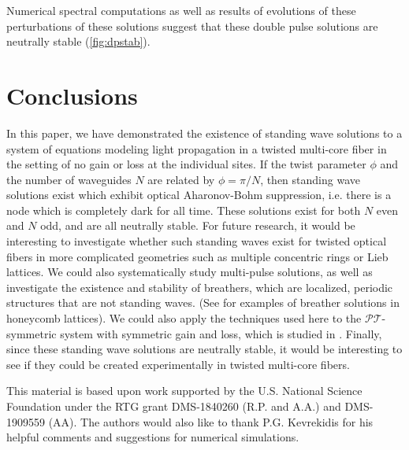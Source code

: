 \documentclass[reprint, amsmath,amssymb,aps,pra]{revtex4-2}
\begin{document}
Numerical spectral computations as well as results of evolutions of these perturbations of these solutions suggest that these double pulse solutions are neutrally stable (\cref{fig:dpstab}).

\section{Conclusions}

In this paper, we have demonstrated the existence of standing wave solutions to a system of equations modeling light propagation in a twisted multi-core fiber in the setting of no gain or loss at the individual sites. If the twist parameter $\phi$ and the number of waveguides $N$ are related by $\phi = \pi/N$, then standing wave solutions exist which exhibit optical Aharonov-Bohm suppression, i.e. there is a node which is completely dark for all time. These solutions exist for both $N$ even and $N$ odd, and are all neutrally stable. For future research, it would be interesting to investigate whether such standing waves exist for twisted optical fibers in more complicated geometries such as multiple concentric rings or Lieb lattices. We could also systematically study multi-pulse solutions, as well as investigate the existence and stability of breathers, which are localized, periodic structures that are not standing waves. (See \cite{Lumer2013} for examples of breather solutions in honeycomb lattices). We could also apply the techniques used here to the $\mathcal{PT}$-symmetric system with symmetric gain and loss, which is studied in \cite{castro2016}. Finally, since these standing wave solutions are neutrally stable, it would be interesting to see if they could be created experimentally in twisted multi-core fibers.

\begin{acknowledgments}
This material is based upon work supported by the U.S. National Science Foundation under the RTG grant DMS-1840260 (R.P. and A.A.) and DMS-1909559 (AA). The authors would also like to thank P.G. Kevrekidis for his helpful comments and suggestions for numerical simulations.
\end{acknowledgments}



\end{document}
